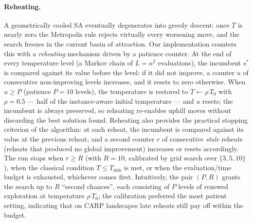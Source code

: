 \paragraph{Reheating.}
A geometrically cooled SA eventually degenerates into greedy descent: once
$T$ is nearly zero the Metropolis rule rejects virtually every worsening
move, and the search freezes in the current basin of attraction. Our
implementation counters this with a \emph{reheating} mechanism driven by a
patience counter. At the end of every temperature level (a Markov chain of
$L = n^2$ evaluations), the incumbent $s^{*}$ is compared against its value
before the level: if it did not improve, a counter $u$ of consecutive
non-improving levels increases, and it resets to zero otherwise. When
$u \geq P$ (patience $P = 10$ levels), the temperature is restored to
$T \leftarrow \rho\, T_0$ with $\rho = 0.5$ --- half of the instance-aware
initial temperature --- and $u$ resets; the incumbent is always preserved,
so reheating re-enables uphill moves without discarding the best solution
found. Reheating also provides the practical stopping criterion of the
algorithm: at each reheat, the incumbent is compared against its value at
the previous reheat, and a second counter $r$ of consecutive
\emph{stale} reheats (reheats that produced no global improvement)
increases or resets accordingly. The run stops when $r \geq R$ (with
$R = 10$, calibrated by grid search over $\{3, 5, 10\}$), when the
classical condition $T \leq T_{\min}$ is met, or when the evaluation/time
budget is exhausted, whichever comes first. Intuitively, the pair $(P, R)$
grants the search up to $R$ ``second chances'', each consisting of $P$
levels of renewed exploration at temperature $\rho\, T_0$; the calibration
preferred the most patient setting, indicating that on CARP landscapes
late reheats still pay off within the budget.
